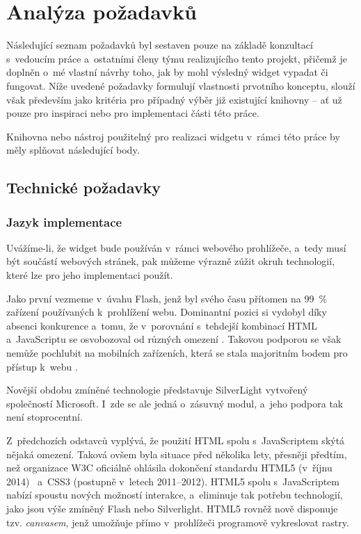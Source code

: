 \graphicspath{{text/analyza-pozadavku/img/}}

\chapter{Analýza požadavků}
	\label{analyza-pozadavku}
	
	Následující seznam požadavků byl sestaven pouze na základě konzultací s~vedoucím práce a~ostatními členy týmu realizujícího tento projekt, přičemž je doplněn o~mé vlastní návrhy toho, jak by mohl výsledný widget vypadat či fungovat. Níže uvedené požadavky formulují vlastnosti prvotního konceptu, slouží však především jako kritéria pro případný výběr již existující knihovny -- ať už pouze pro inspiraci nebo pro implementaci části této práce.

	Knihovna nebo nástroj použitelný pro realizaci widgetu v~rámci této práce by měly splňovat následující body.

	\section{Technické požadavky}
		\label{technicke-pozadavky}

		\subsection*{Jazyk implementace}
			\label{jazyk-implementace}

			Uvážíme-li, že widget bude používán v~rámci webového prohlížeče, a~tedy musí být součástí webových stránek, pak můžeme výrazně zúžit okruh technologií, které lze pro jeho implementaci použít.

			Jako první vezmeme v~úvahu {\sf Flash}, jenž byl svého času přítomen na 99~\% zařízení používaných k~prohlížení webu. Dominantní pozici si vydobyl díky absenci konkurence a~tomu, že v~porovnání s~tehdejší kombinací HTML a~JavaScriptu se osvobozoval od různých omezení \cite{simpson-2012}. Takovou podporou se však nemůže pochlubit na mobilních zařízeních, která se stala majoritním bodem pro přístup k~webu \cite{smart-insights-2015}.

			Novější obdobu zmíněné technologie představuje {\sf SilverLight} vytvořený společ\-ností Microsoft. I~zde se ale jedná o~zásuvný modul, a~jeho podpora tak není stoprocentní.

			Z~předchozích odstavců vyplývá, že použití HTML spolu s~JavaScriptem skýtá nějaká omezení. Taková ovšem byla situace před několika lety, přesněji předtím, než organizace W3C oficiálně ohlásila dokončení standardu HTML5 (v~říjnu 2014)~\cite{w3c-2014} a~CSS3 (postupně v~letech 2011--2012). HTML5 spolu s~JavaScriptem nabízí spoustu nových možností interakce, a~eliminuje tak potřebu technologií, jako jsou výše zmíněný {\sf Flash} nebo {\sf Silverlight}. HTML5 rovněž nově disponuje tzv. \emph{canvasem}, jenž umožňuje přímo v~prohlížeči programově vykreslovat rastry.

